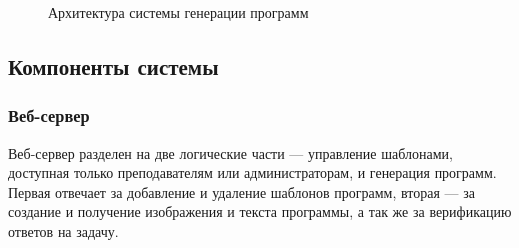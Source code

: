 \begin{figure}[ht]
    \begin{center}
        \caption{\label{architecture} Архитектура системы генерации программ}
    \end{center}
\end{figure}
\clearpage

\subsection{Компоненты системы}

\subsubsection{Веб-сервер}
Веб-сервер разделен на две логические части ---
управление шаблонами, доступная только преподавателям
или администраторам, и генерация программ. Первая отвечает
за добавление и удаление шаблонов программ, вторая --- за создание и получение изображения
и текста программы, а так же за верификацию ответов на задачу.

